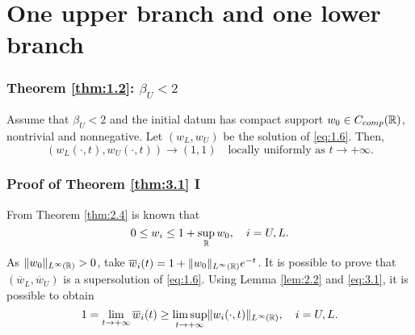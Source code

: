 \section{One upper branch and one lower branch}


    




\begin{frame}
    \frametitle{Theorem \ref{thm:1.2}: \texorpdfstring{\(\beta_U < 2\)}{betaU < 2}}
    \begin{theorem}
        Assume that \(\beta_U < 2\) and the initial datum has compact support \(w_{0} \in C_{comp}(\mathbb{R})\), nontrivial and nonnegative. Let \((w_L, w_{U})\) be the solution of \eqref{eq:1.6}. Then,
        \[
            (w_L(\cdot, t), w_{U}(\cdot, t)) \to (1, 1) \quad \text{locally uniformly as } t \to +\infty.
        \]
        \label{thm:3.1} 
    \end{theorem}
\end{frame}


\begin{frame}
    \frametitle{Proof of Theorem \ref{thm:3.1} I}
    \begin{proofs}
        From Theorem \ref{thm:2.4} is known that 
    \begin{equation}
        0 \leq w_{i} \leq 1 + \sup_{\mathbb{R}} w_{0}, \quad i = U, L.
        \label{eq:3.1}
    \end{equation}
    As \(\lVert w_{0}\rVert_{L^{\infty}(\mathbb{R})} > 0\), take \(\overline{w}_i(t) = 1 + \lVert w_{0}\rVert_{L^{\infty}(\mathbb{R})}e^{-t}\). 
    It is possible to prove that \((\overline{w}_L, \overline{w}_U)\) is a supersolution of \eqref{eq:1.6}. Using Lemma \ref{lem:2.2} and \eqref{eq:3.1}, it is possible to obtain 
    \begin{equation}
        1 = \lim_{t \to +\infty} \overline{w}_i(t) \geq \limsup_{t \to +\infty} \lVert w_i(\cdot, t)\rVert_{L^{\infty}(\mathbb{R})}, \quad i = U, L.
        \label{eq:3.2}
    \end{equation}
    \end{proofs}
\end{frame}


